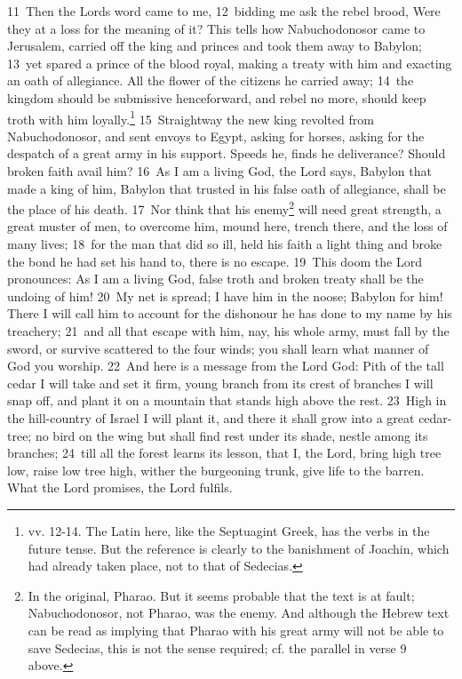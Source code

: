 \documentclass[10pt]{book} %
\begin{document}
\textcolor{benred8}{11}~Then the Lord\textquotesingle s word came to me, \textcolor{benred8}{12}~bidding me ask the rebel brood, Were they at a loss for the meaning of it? This tells how Nabuchodonosor came to Jerusalem, carried off the king and princes and took them away to Babylon; \textcolor{benred8}{13}~yet spared a prince of the blood royal, making a treaty with him and exacting an oath of allegiance. All the flower of the citizens he carried away; \textcolor{benred8}{14}~the kingdom should be submissive henceforward, and rebel no more, should keep troth with him loyally.\footnote[2]{vv. 12-14. The Latin here, like the Septuagint Greek, has the verbs in the future tense. But the reference is clearly to the banishment of Joachin, which had already taken place, not to that of Sedecias.} \textcolor{benred8}{15}~Straightway the new king revolted from Nabuchodonosor, and sent envoys to Egypt, asking for horses, asking for the despatch of a great army in his support. Speeds he, finds he deliverance? Should broken faith avail him? \textcolor{benred8}{16}~As I am a living God, the Lord says, Babylon that made a king of him, Babylon that trusted in his false oath of allegiance, shall be the place of his death. \textcolor{benred8}{17}~Nor think that his enemy\footnote[3]{In the original, \textasciigrave Pharao\textquotesingle . But it seems probable that the text is at fault; Nabuchodonosor, not Pharao, was the enemy. And although the Hebrew text can be read as implying that Pharao with his great army will not be able to save Sedecias, this is not the sense required; cf. the parallel in verse 9 above.} will need great strength, a great muster of men, to overcome him, mound here, trench there, and the loss of many lives; \textcolor{benred8}{18}~for the man that did so ill, held his faith a light thing and broke the bond he had set his hand to, there is no escape. \textcolor{benred8}{19}~This doom the Lord pronounces: As I am a living God, false troth and broken treaty shall be the undoing of him! \textcolor{benred8}{20}~My net is spread; I have him in the noose; Babylon for him! There I will call him to account for the dishonour he has done to my name by his treachery; \textcolor{benred8}{21}~and all that escape with him, nay, his whole army, must fall by the sword, or survive scattered to the four winds; you shall learn what manner of God you worship.
\textcolor{benred8}{22}~And here is a message from the Lord God: Pith of the tall cedar I will take and set it firm, young branch from its crest of branches I will snap off, and plant it on a mountain that stands high above the rest. \textcolor{benred8}{23}~High in the hill-country of Israel I will plant it, and there it shall grow into a great cedar-tree; no bird on the wing but shall find rest under its shade, nestle among its branches; \textcolor{benred8}{24}~till all the forest learns its lesson, that I, the Lord, bring high tree low, raise low tree high, wither the burgeoning trunk, give life to the barren. What the Lord promises, the Lord fulfils.
\end{document}
